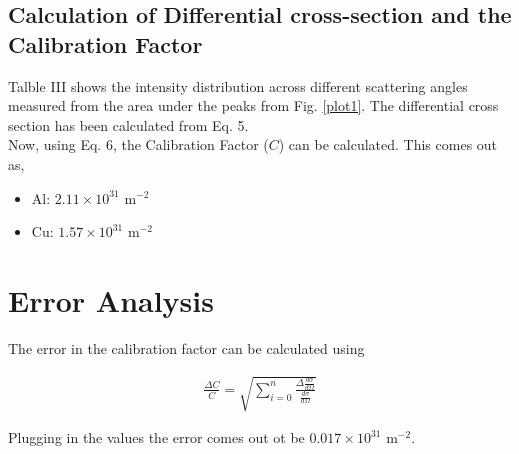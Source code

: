 \subsection{Calculation of Differential cross-section and the Calibration Factor}

Talble III shows the intensity distribution across different scattering angles measured from the area under the peaks from Fig. \ref{plot1}. The differential cross section has been calculated from Eq. 5.\\



Now, using Eq. 6, the Calibration Factor ($C$) can be calculated. This comes out as,

\begin{itemize}
    \item Al: $2.11\times 10^{31}$ m$^{-2}$
    \item Cu: $1.57 \times 10^{31}$ m$^{-2}$
\end{itemize}

\section{Error Analysis}

The error in the calibration factor can be calculated using

\begin{align}
    \frac{\Delta C}{C} = \sqrt{\sum_{i=0}^n \frac{\Delta \frac{d\sigma}{d\Omega}}{\frac{d\sigma}{d\Omega}}}
\end{align}

Plugging in the values the error comes out ot be $0.017 \times 10^{31}$ m$^{-2}$.